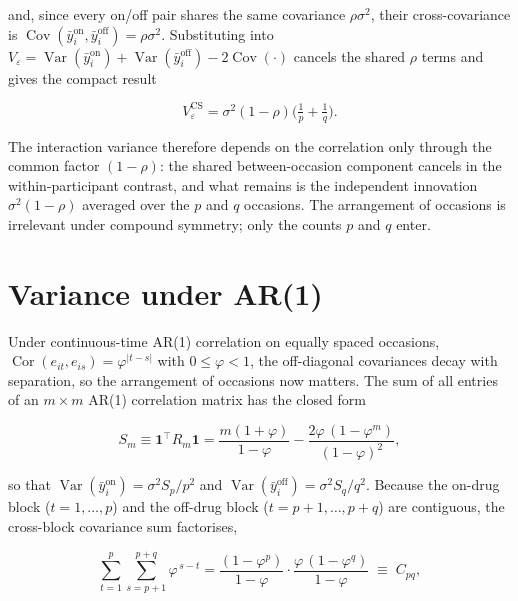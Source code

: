 \documentclass[
  11pt,
]{article}
\begin{document}
and, since every on/off pair shares the same covariance \(\rho
\sigma^2\), their cross-covariance is
\(\operatorname{Cov}(\bar y_i^{\text{on}}, \bar y_i^{\text{off}}) =
\rho\sigma^2\). Substituting into \(V_\varepsilon =
\operatorname{Var}(\bar y_i^{\text{on}}) + \operatorname{Var}(\bar
y_i^{\text{off}}) - 2\operatorname{Cov}(\cdot)\) cancels the shared
\(\rho\) terms and gives the compact result

\begin{equation}
\boxed{\;V_\varepsilon^{\mathrm{CS}}
  = \sigma^2 (1-\rho)\Big(\tfrac{1}{p} + \tfrac{1}{q}\Big).\;}
\label{eq:cs}
\end{equation}

The interaction variance therefore depends on the correlation only
through the common factor \((1-\rho)\): the shared between-occasion
component cancels in the within-participant contrast, and what
remains is the independent innovation \(\sigma^2(1-\rho)\) averaged over
the \(p\) and \(q\) occasions. The arrangement of occasions is irrelevant
under compound symmetry; only the counts \(p\) and \(q\) enter.

\section{Variance under AR(1)}\label{variance-under-ar1}

Under continuous-time AR(1) correlation on equally spaced occasions,
\(\operatorname{Cor}(e_{it}, e_{is}) = \varphi^{|t-s|}\) with
\(0 \le \varphi < 1\), the off-diagonal covariances decay with
separation, so the arrangement of occasions now matters. The sum of
all entries of an \(m \times m\) AR(1) correlation matrix has the
closed form

\begin{equation}
S_m \equiv \mathbf{1}^\top R_m \mathbf{1}
  = \frac{m(1+\varphi)}{1-\varphi}
  - \frac{2\varphi\,(1-\varphi^{m})}{(1-\varphi)^2},
\label{eq:Sm}
\end{equation}

so that \(\operatorname{Var}(\bar y_i^{\text{on}}) = \sigma^2 S_p/p^2\)
and \(\operatorname{Var}(\bar y_i^{\text{off}}) = \sigma^2 S_q/q^2\).
Because the on-drug block (\(t = 1, \dots, p\)) and the off-drug block
(\(t = p+1, \dots, p+q\)) are contiguous, the cross-block covariance sum
factorises,

\begin{equation}
\sum_{t=1}^{p}\sum_{s=p+1}^{p+q}\varphi^{\,s-t}
  = \frac{(1-\varphi^{p})}{1-\varphi}\cdot
    \frac{\varphi\,(1-\varphi^{q})}{1-\varphi}
  \;\equiv\; C_{pq},
\label{eq:Cpq}
\end{equation}
\end{document}
